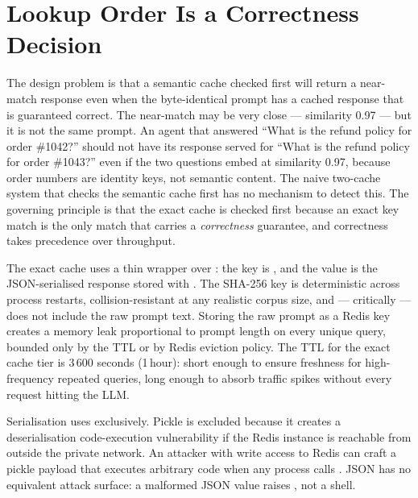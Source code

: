 \section{Lookup Order Is a Correctness Decision}
\label{sec:cache-tiers}

The design problem is that a semantic cache checked first will return a
near-match response even when the byte-identical prompt has a cached
response that is guaranteed correct. The near-match may be very close ---
similarity 0.97 --- but it is not the same prompt. An agent that answered
``What is the refund policy for order \#1042?'' should not have its
response served for ``What is the refund policy for order \#1043?'' even
if the two questions embed at similarity 0.97, because order numbers are
identity keys, not semantic content. The naive two-cache system that
checks the semantic cache first has no mechanism to detect this. The
governing principle is that the exact cache is checked first because an
exact key match is the only match that carries a \emph{correctness}
guarantee, and correctness takes precedence over throughput.

The exact cache uses a thin wrapper over : the key is
,
and the value is the JSON-serialised response stored with .
The SHA-256 key is deterministic across process restarts, collision-resistant
at any realistic corpus size, and --- critically --- does not include the
raw prompt text. Storing the raw prompt as a Redis key creates a memory
leak proportional to prompt length on every unique query, bounded only
by the TTL or by Redis eviction policy. The TTL for the exact cache tier
is 3\,600 seconds (1\,hour): short enough to ensure freshness for
high-frequency repeated queries, long enough to absorb traffic spikes
without every request hitting the LLM.

Serialisation uses  exclusively. Pickle is excluded
because it creates a deserialisation code-execution vulnerability if the
Redis instance is reachable from outside the private network. An attacker
with write access to Redis can craft a pickle payload that executes
arbitrary code when any process calls . JSON has
no equivalent attack surface: a malformed JSON value raises
, not a shell.

